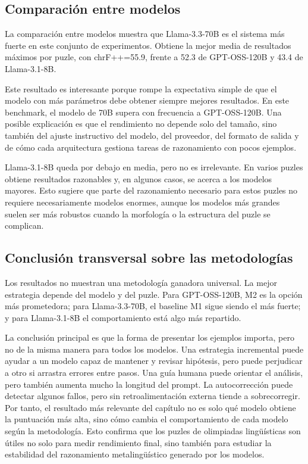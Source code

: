 \subsection*{Comparación entre modelos}

La comparación entre modelos muestra que Llama-3.3-70B es el sistema más fuerte en este conjunto de experimentos. Obtiene la mejor media de resultados máximos por puzle, con chrF++=55.9, frente a 52.3 de GPT-OSS-120B y 43.4 de Llama-3.1-8B.

Este resultado es interesante porque rompe la expectativa simple de que el modelo con más parámetros debe obtener siempre mejores resultados. En este benchmark, el modelo de 70B supera con frecuencia a GPT-OSS-120B. Una posible explicación es que el rendimiento no depende solo del tamaño, sino también del ajuste instructivo del modelo, del proveedor, del formato de salida y de cómo cada arquitectura gestiona tareas de razonamiento con pocos ejemplos.

Llama-3.1-8B queda por debajo en media, pero no es irrelevante. En varios puzles obtiene resultados razonables y, en algunos casos, se acerca a los modelos mayores. Esto sugiere que parte del razonamiento necesario para estos puzles no requiere necesariamente modelos enormes, aunque los modelos más grandes suelen ser más robustos cuando la morfología o la estructura del puzle se complican.

\subsection*{Conclusión transversal sobre las metodologías}

Los resultados no muestran una metodología ganadora universal. La mejor estrategia depende del modelo y del puzle. Para GPT-OSS-120B, M2 es la opción más prometedora; para Llama-3.3-70B, el baseline M1 sigue siendo el más fuerte; y para Llama-3.1-8B el comportamiento está algo más repartido.

La conclusión principal es que la forma de presentar los ejemplos importa, pero no de la misma manera para todos los modelos. Una estrategia incremental puede ayudar a un modelo capaz de mantener y revisar hipótesis, pero puede perjudicar a otro si arrastra errores entre pasos. Una guía humana puede orientar el análisis, pero también aumenta mucho la longitud del prompt. La autocorrección puede detectar algunos fallos, pero sin retroalimentación externa tiende a sobrecorregir. Por tanto, el resultado más relevante del capítulo no es solo qué modelo obtiene la puntuación más alta, sino cómo cambia el comportamiento de cada modelo según la metodología. Esto confirma que los puzles de olimpiadas lingüísticas son útiles no solo para medir rendimiento final, sino también para estudiar la estabilidad del razonamiento metalingüístico generado por los modelos.
